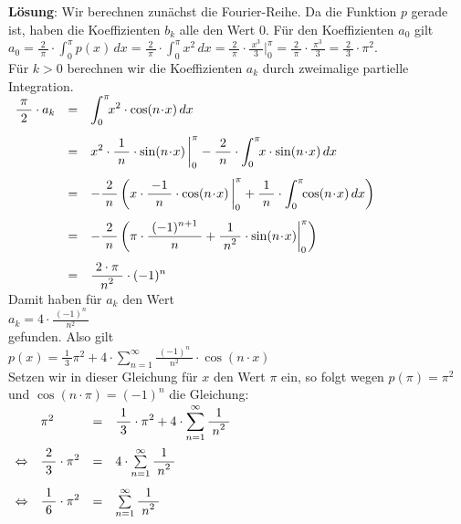 \documentclass{article}
\newcommand{\bruch}[2]{\displaystyle\frac{\;\displaystyle#1\;}{\;\displaystyle#2\;}}
\begin{document}
\noindent
\textbf{L\"osung}: Wir berechnen zun\"achst die Fourier-Reihe.  Da die Funktion $p$ gerade
ist, haben die Koeffizienten $b_k$ alle den Wert $0$.  F\"ur den Koeffizienten $a_0$ gilt 
\\[0.1cm]
\hspace*{1.3cm}
$\displaystyle a_0 = 
\bruch{2}{\pi}\cdot\int_0^{\pi} p(x)\,dx = 
\bruch{2}{\pi}\cdot\int_0^{\pi} x^2\,dx = 
\bruch{2}{\pi}\cdot \bruch{x^3}{3} \bigg|_0^{\pi} = 
\bruch{2}{\pi}\cdot \bruch{\pi^3}{3}  = 
\bruch{2}{3}\cdot\pi^2$. 
\\[0.1cm]
F\"ur $k>0$ berechnen wir die Koeffizienten $a_k$ durch zweimalige partielle Integration.
\\[0.3cm]
\hspace*{1.3cm}
$
\begin{array}[t]{lcl} 
\bruch{\pi}{2}\cdot a_k 
& = & \displaystyle
\int_0^{\pi}\!\! x^2\cdot \cos(n\!\cdot\!x)\, dx \\[0.5cm]
& = & \displaystyle
x^2\cdot\bruch{1}{n}\cdot\sin(n\!\cdot\!x) \,\bigg|_0^{\pi} - \bruch{2}{n}\cdot \int_0^{\pi}\!\! x\cdot \sin(n\!\cdot\!x)\, dx \\[0.5cm]
& = & \displaystyle
-\bruch{2}{n}\left( x\cdot\bruch{-1}{n}\cdot\cos(n\!\cdot\!x) \,\bigg|_0^{\pi} + \bruch{1}{n}\cdot \int_0^{\pi}\!\! \cos(n\!\cdot\!x)\, dx \right)\\[0.5cm]
& = & \displaystyle
-\bruch{2}{n}\left( \pi\cdot\bruch{(-1)^{n+1}}{n} + \bruch{1}{n^2}\cdot \sin(n\!\cdot\!x)\bigg|_0^{\pi} \right)\\[0.5cm]
& = & \displaystyle
\bruch{2\cdot\pi}{n^2} \cdot (-1)^n 
\end{array}
$
\\[0.3cm]
Damit haben f\"ur $a_k$ den Wert 
\\[0.1cm]
\hspace*{4.3cm}
$a_k = 4\cdot \bruch{(-1)^n}{n^2}$
\\[0.1cm]
gefunden.  Also gilt 
\\[0.1cm]
\hspace*{4.3cm}
$p(x) = \bruch{1}{3} \pi^2 + 4\cdot\sum\limits_{n=1}^\infty \bruch{(-1)^n}{n^2}\cdot\cos(n\!\cdot\!x)$
\\[0.3cm]
Setzen wir in dieser Gleichung f\"ur $x$ den Wert $\pi$ ein, so  folgt wegen 
$p(\pi) = \pi^2$ und $\cos(n\!\cdot\!\pi) = (-1)^n$ die Gleichung:
\\[0.3cm]
\hspace*{1.3cm}
$
\begin{array}[t]{llcl}
               & \pi^2  & = & \bruch{1}{3}\cdot \pi^2 + 4 \cdot \sum\limits_{n=1}^\infty \bruch{1}{n^2} \\[0.5cm]
\Leftrightarrow& \bruch{2}{3} \cdot \pi^2  & = &  4 \cdot\sum\limits_{n=1}^\infty \bruch{1}{n^2} \\[0.5cm]
\Leftrightarrow& \bruch{1}{6} \cdot \pi^2  & = &  \sum\limits_{n=1}^\infty \bruch{1}{n^2} \\[0.5cm]
\end{array}
$
\end{document}
